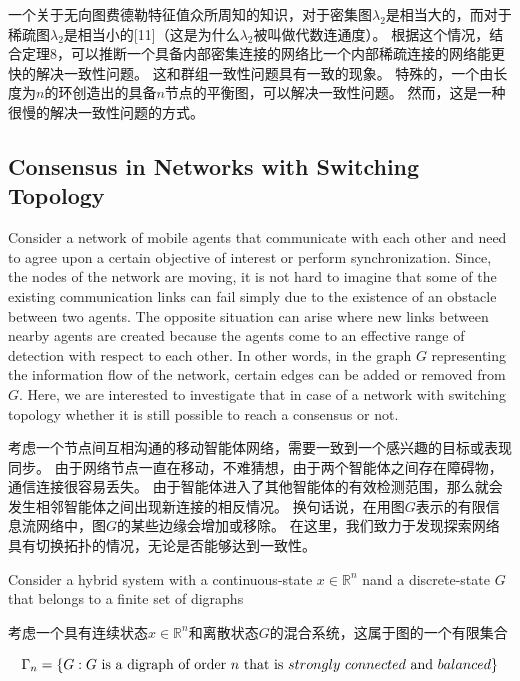 \documentclass{article}
\begin{document}
一个关于无向图费德勒特征值众所周知的知识，对于密集图$\lambda_2$是相当大的，而对于稀疏图$\lambda_2$是相当小的[11]（这是为什么$\lambda_2$被叫做代数连通度）。
根据这个情况，结合定理8，可以推断一个具备内部密集连接的网络比一个内部稀疏连接的网络能更快的解决一致性问题。
这和群组一致性问题具有一致的现象。
特殊的，一个由长度为$n$的环创造出的具备$n$节点的平衡图，可以解决一致性问题。
然而，这是一种很慢的解决一致性问题的方式。

\subsection{Consensus in Networks with Switching Topology}
{\color[gray]{0.5}
\noindent Consider a network of mobile agents that communicate with each other and need to agree upon a certain objective of interest or perform synchronization. 
Since, the nodes of the network are moving, it is not hard to imagine that some of the existing communication links can fail simply due to the existence of an obstacle between two agents. 
The opposite situation can arise where new links between nearby agents are created because the agents come to an eﬀective range of detection with respect to each other. 
In other words, in the graph $G$ representing the information ﬂow of the network, certain edges can be added or removed from $G$. 
Here, we are interested to investigate that in case of a network with switching topology whether it is still possible to reach a consensus or not.
}

\noindent 考虑一个节点间互相沟通的移动智能体网络，需要一致到一个感兴趣的目标或表现同步。
由于网络节点一直在移动，不难猜想，由于两个智能体之间存在障碍物，通信连接很容易丢失。
由于智能体进入了其他智能体的有效检测范围，那么就会发生相邻智能体之间出现新连接的相反情况。
换句话说，在用图$G$表示的有限信息流网络中，图$G$的某些边缘会增加或移除。
在这里，我们致力于发现探索网络具有切换拓扑的情况，无论是否能够达到一致性。

{\color[gray]{0.5}
Consider a hybrid system with a continuous-state $x \in \mathbb{R}^n$ nand a discrete-state $G$ that belongs to a ﬁnite set of digraphs
}

考虑一个具有连续状态$x \in \mathbb{R}^n$和离散状态$G$的混合系统，这属于图的一个有限集合

\begin{equation}
    \Gamma_n = \{ G: G\ \text{is a digraph of order}\ n\ \text{that is}\ strongly\ connected\ \text{and}\ balanced \}
    \notag
\end{equation}
\end{document}
